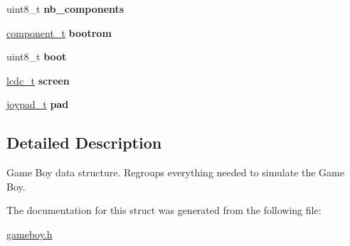 \begin{DoxyCompactItemize}
uint8\+\_\+t {\bfseries nb\+\_\+components}
\item 
\mbox{\label{structgameboy___a483d3fa9c27f56719347802cb4e2cc6e}} 
\hyperlink{structcomponent__t}{component\+\_\+t} {\bfseries bootrom}
\item 
\mbox{\label{structgameboy___a9e312660adf30b68b6cd3e930bd1fdd9}} 
uint8\+\_\+t {\bfseries boot}
\item 
\mbox{\label{structgameboy___a6bc5908763bf31c1101692923bd156c6}} 
\hyperlink{structlcdc__t}{lcdc\+\_\+t} {\bfseries screen}
\item 
\mbox{\label{structgameboy___a6879eca8ddd674feb8bc42115ba9f9d9}} 
\hyperlink{structjoypad__t}{joypad\+\_\+t} {\bfseries pad}
\end{DoxyCompactItemize}


\subsection{Detailed Description}
Game Boy data structure. Regroups everything needed to simulate the Game Boy. 

The documentation for this struct was generated from the following file\+:\begin{DoxyCompactItemize}
\item 
\hyperlink{gameboy_8h}{gameboy.\+h}\end{DoxyCompactItemize}
